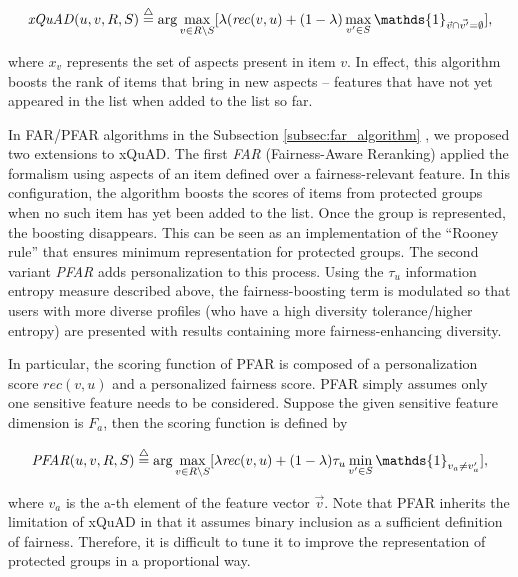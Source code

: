 \begin{equation}
    \mathit{xQuAD}(u,v,R,S)\buildrel\triangle\over= \arg\max_{v \in R \setminus S} [\lambda  (\mathit{rec}(v,u) + (1 - \lambda) \max_{v' \in S} \mathds{1}_{\vec{v} \cap \Vec{v'} = \emptyset}],
\label{eq:xquad}
\end{equation}
\vspace{0.25cm}

\noindent where $x_v$ represents the set of aspects present in item $v$. In effect, this algorithm boosts the rank of items that bring in new aspects -- features that have not yet appeared in the list when added to the list so far. 

In FAR/PFAR algorithms in the Subsection \ref{subsec:far_algorithm} \cite{liu2018personalizing,liu2019personalized}, we proposed two extensions to xQuAD. The first \textit{FAR} (Fairness-Aware Reranking) applied the formalism using aspects of an item defined over a fairness-relevant feature. In this configuration, the algorithm boosts the scores of items from protected groups when no such item has yet been added to the list. Once the group is represented, the boosting disappears. This can be seen as an implementation of the ``Rooney rule'' \cite{kleinberg2018selection} that ensures minimum representation for protected groups. The second variant \textit{PFAR} adds personalization to this process. Using the $\tau_u$ information entropy measure described above, the fairness-boosting term is modulated so that users with more diverse profiles (who have a high diversity tolerance/higher entropy) are presented with results containing more fairness-enhancing diversity.

In particular, the scoring function of PFAR is composed of a personalization score $\mathit{rec}(v,u)$ and a personalized fairness score. PFAR simply assumes only one sensitive feature needs to be considered. Suppose the given sensitive feature dimension is $F_a$, then the scoring function is defined by

\begin{equation}
    \mathit{PFAR}(u,v,R,S)\buildrel\triangle\over= \arg\max_{v \in R \setminus S}[\lambda\mathit{rec}(v,u) + (1-\lambda)\tau_u \min_{v' \in S} \mathds{1}_{v_{a} \neq v'_{a}}],
\end{equation}
\vspace{0.25cm}

where $v_{a}$ is the a-th element of the feature vector $\vec{v}$.
Note that PFAR inherits the limitation of xQuAD in that it assumes binary inclusion as a sufficient definition of fairness. Therefore, it is difficult to tune it to improve the representation of protected groups in a proportional way. 


